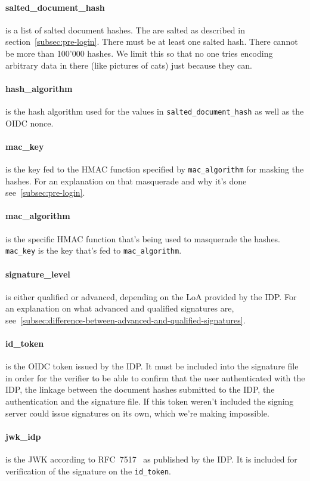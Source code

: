 \paragraph{salted\_document\_hash} is a list of salted document hashes.
The are salted as described in section~\ref{subsec:pre-login}.
There must be at least one salted hash.
There cannot be more than 100'000 hashes.
We limit this so that no one tries encoding arbitrary data in there (like pictures of cats) just because they can.

\paragraph{hash\_algorithm} is the hash algorithm used for the values in \texttt{salted\_document\_hash} as well as the \gls{OIDC} nonce.
\paragraph{mac\_key} is the key fed to the \gls{HMAC} function specified by \texttt{mac\_algorithm} for masking the hashes.
For an explanation on that masquerade and why it's done see~\ref{subsec:pre-login}.
\paragraph{mac\_algorithm} is the specific \gls{HMAC} function that's being used to masquerade the hashes.
\texttt{mac\_key} is the key that's fed to \texttt{mac\_algorithm}.
\paragraph{signature\_level} is either qualified or advanced, depending on the \gls{LoA} provided by the \gls{IDP}.
For an explanation on what advanced and qualified signatures are, see~\ref{subsec:difference-between-advanced-and-qualified-signatures}.
\paragraph{id\_token} is the \gls{OIDC} token issued by the \gls{IDP}.
It must be included into the signature file in order for the verifier to be able to confirm that the user authenticated with the \gls{IDP},
the linkage between the document hashes submitted to the \gls{IDP}, the authentication and the signature file.
If this token weren't included the signing server could issue signatures on its own, which we're making impossible.
\paragraph{jwk\_idp} is the \gls{JWK} according to RFC~7517~\cite{rfc7517} as published by the \gls{IDP}.
It is included for verification of the signature on the \texttt{id\_token}.
